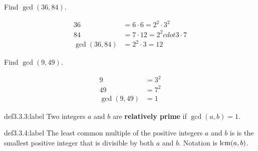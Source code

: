 \begin{problem}
    Find $\gcd(36,84).$

    $$
    \begin{aligned}
        36 &= 6 \cdot 6 = 2^2 \cdot 3^2\\
        84 &= 7 \cdot 12 = 2^2 cdot 3 \cdot 7\\
        \gcd(36,84) &= 2^2 \cdot 3 = 12
    \end{aligned}
    $$
\end{problem}

\begin{problem}
    Find $\gcd(9,49).$

    $$
    \begin{aligned}
        9 &= 3^2\\
        49 &= 7^2\\
        \gcd(9,49) &= 1
    \end{aligned}
    $$
\end{problem}


\begin{definition}{def3.3.3:label}
    Two integers $a$ and $b$ are \textbf{relatively prime} if $\gcd(a,b) = 1$.
\end{definition}


\begin{definition}{def3.3.4:label}
    The least common multiple of the positive integers $a$ and $b$ is is the smallest positive integer that is divisible by both $a$ and $b$. Notation is $\text{lcm}(a,b)$.
\end{definition}